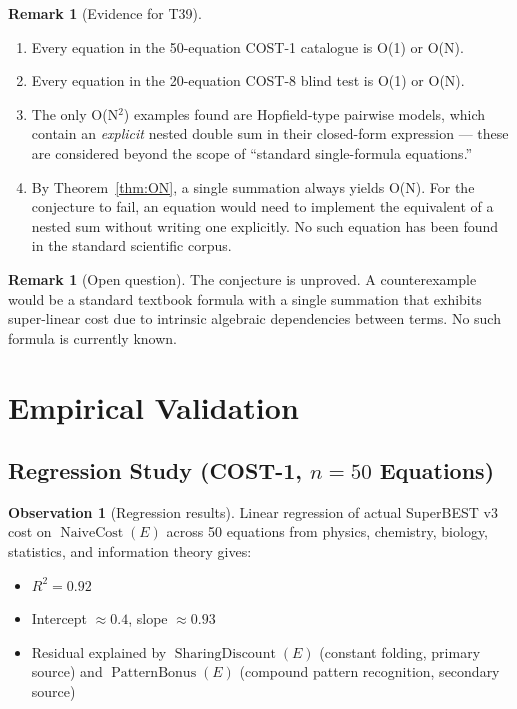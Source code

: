 \documentclass[12pt,a4paper]{article}
\theoremstyle{definition}
\newtheorem{remark}[theorem]{Remark}
\newtheorem{observation}[theorem]{Observation}
\newcommand{\NC}{\operatorname{NaiveCost}}
\newcommand{\SD}{\operatorname{SharingDiscount}}
\newcommand{\PB}{\operatorname{PatternBonus}}
\begin{document}
\begin{remark}[Evidence for T39]
\begin{enumerate}
  \item Every equation in the 50-equation COST-1 catalogue is O(1) or O(N).
  \item Every equation in the 20-equation COST-8 blind test is O(1) or O(N).
  \item The only O(N$^2$) examples found are Hopfield-type pairwise models,
        which contain an \emph{explicit} nested double sum in their
        closed-form expression --- these are considered beyond the scope of
        ``standard single-formula equations.''
  \item By Theorem~\ref{thm:ON}, a single summation always yields O(N).
        For the conjecture to fail, an equation would need to implement the
        equivalent of a nested sum without writing one explicitly.  No such
        equation has been found in the standard scientific corpus.
\end{enumerate}
\end{remark}

\begin{remark}[Open question]
The conjecture is unproved.  A counterexample would be a standard textbook
formula with a single summation that exhibits super-linear cost due to
intrinsic algebraic dependencies between terms.  No such formula is currently
known.
\end{remark}

\section{Empirical Validation}
\label{sec:empirical}

\subsection{Regression Study (COST-1, $n = 50$ Equations)}

\begin{observation}[Regression results]
\label{obs:regression}
Linear regression of actual SuperBEST v3 cost on $\NC(E)$ across 50 equations
from physics, chemistry, biology, statistics, and information theory gives:
\begin{itemize}
  \item $R^2 = 0.92$
  \item Intercept $\approx 0.4$, slope $\approx 0.93$
  \item Residual explained by $\SD(E)$ (constant folding, primary source)
        and $\PB(E)$ (compound pattern recognition, secondary source)
\end{itemize}
\end{observation}
\end{document}
